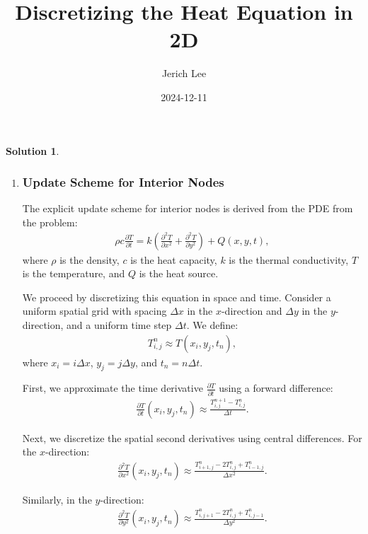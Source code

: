 \documentclass[12pt]{article}
\title{Discretizing the Heat Equation in 2D}
\author{Jerich Lee}
\date{2024-12-11}
\theoremstyle{definition} %
\newtheorem{solution}{Solution}
\theoremstyle{plain} %
\begin{document}
\maketitle


\begin{solution}
\noindent
    \begin{enumerate}
        \item \subsubsection*{Update Scheme for Interior Nodes}

        The explicit update scheme for interior nodes is derived from the PDE from the problem:
        \begin{align}
        \rho c \frac{\partial T}{\partial t} = k \left( \frac{\partial^2 T}{\partial x^2} + \frac{\partial^2 T}{\partial y^2} \right) + Q(x, y, t),
        \end{align}
        where $\rho$ is the density, $c$ is the heat capacity, $k$ is the thermal conductivity, $T$ is the temperature, and $Q$ is the heat source.
        
        \noindent We proceed by discretizing this equation in space and time. Consider a uniform spatial grid with spacing $\Delta x$ in the $x$-direction and $\Delta y$ in the $y$-direction, and a uniform time step $\Delta t$. We define:
        \begin{align}
        T_{i,j}^n \approx T(x_i, y_j, t_n),
        \end{align}
        where $x_i = i \Delta x$, $y_j = j \Delta y$, and $t_n = n \Delta t$.
        
        \noindent First, we approximate the time derivative $\frac{\partial T}{\partial t}$ using a forward difference:
        \begin{align}
        \frac{\partial T}{\partial t}(x_i, y_j, t_n) \approx \frac{T_{i,j}^{n+1} - T_{i,j}^n}{\Delta t}.
        \end{align}
        
        \noindent Next, we discretize the spatial second derivatives using central differences. For the $x$-direction:
        \begin{align}
        \frac{\partial^2 T}{\partial x^2}(x_i, y_j, t_n) \approx \frac{T_{i+1,j}^n - 2T_{i,j}^n + T_{i-1,j}^n}{\Delta x^2}.
        \end{align}
        
        \noindent Similarly, in the $y$-direction:
        \begin{align}
        \frac{\partial^2 T}{\partial y^2}(x_i, y_j, t_n) \approx \frac{T_{i,j+1}^n - 2T_{i,j}^n + T_{i,j-1}^n}{\Delta y^2}.
        \end{align}
        

\end{enumerate}
\end{solution}
\end{document}
